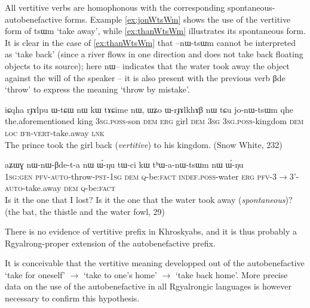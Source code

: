 \documentclass[oldfontcommands,oneside,a4paper,11pt]{article}
\newcommand{\ipa}[1]{{\phon \mbox{#1}}} %
\begin{document}
All vertitive verbs are homophonous with the corresponding spontaneous-autobenefactive forms. Example \ref{ex:jonWtsWm} shows the use of the vertitive form of \ipa{tsɯm} `take away', while \ref{ex:thanWtsWm} illustrates its spontaneous form. It is clear in the case of \ref{ex:thanWtsWm} that \ipa{--nɯ-tsɯm} cannot be interpreted as `take back' (since a river flows in one direction and does not take back floating objects to its source); here \ipa{nɯ--} indicates that the water took away the object against the will of the speaker -- it is also present with the previous verb \ipa{βde} `throw' to express the meaning `throw by mistake'.


\begin{exe}
\ex \label{ex:jonWtsWm}
\gll
\ipa{iɕqha} 	\ipa{rɟɤlpu} 	\ipa{ɯ-tɕɯ} 	\ipa{nɯ} 	\ipa{kɯ} 	\ipa{tɤɕime} 	\ipa{nɯ,} 	\ipa{ɯʑo} 	\ipa{ɯ-rɟɤlkhɤβ} 	\ipa{nɯ} 	\ipa{tɕu} 	\ipa{jo-nɯ-tsɯm} 	\ipa{qhe} \\
the.aforementioned king \textsc{3sg.poss}-son \textsc{dem} \textsc{erg} girl \textsc{dem} \textsc{3sg} \textsc{3sg.poss}-kingdom \textsc{dem} \textsc{loc} \textsc{ifr-vert}-take.away \textsc{lnk} \\
\glt The prince took the girl back (\textit{vertitive}) to his kingdom. (Snow White, 232)
\end{exe}



\begin{exe}
\ex \label{ex:thanWtsWm}
\gll
\ipa{aʑɯɣ} 	\ipa{nɯ-nɯ-βde-t-a} 	\ipa{nɯ} 	\ipa{ɯ́-ŋu} 	\ipa{tɯ-ci} 	\ipa{kɯ} 	\ipa{tʰɯ-a-nɯ-tsɯm} 	\ipa{nɯ} 	\ipa{ɯ́-ŋu} \\
\textsc{1sg:gen} \textsc{pfv-auto}-throw-\textsc{pst-1sg} \textsc{dem} \textsc{q}-be:\textsc{fact} \textsc{indef.poss}-water \textsc{erg} \textsc{pfv}-3$\rightarrow$3'-\textsc{auto}-take.away \textsc{dem} \textsc{q}-be:\textsc{fact} \\
\glt Is it the one that I lost? Is it the one that the water took away (\textit{spontaneous})? (the bat, the thistle and the water fowl, 29)
\end{exe}


There is no evidence of vertitive prefix in Khroskyabs, and it is thus probably a Rgyalrong-proper extension of the autobenefactive prefix.


It is conceivable that the vertitive meaning developped out of the autobenefactive `take for oneself' $\rightarrow$ `take to one's home' $\rightarrow$ `take back home'. More precise data on the use of the autobenefactive in all Rgyalrongic languages is however necessary to confirm this hypothesis.
\end{document}
